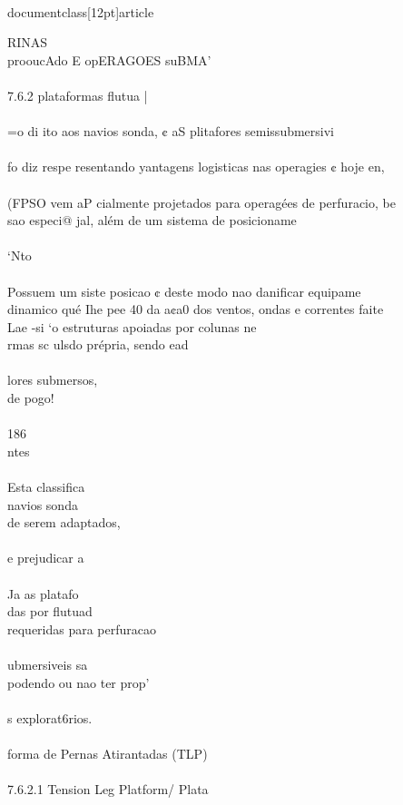 \\documentclass[12pt]{article}
\begin{document}
RINAS\\
prooucAdo E opERAGOES suBMA'\\
\\
7.6.2 plataformas flutua |\\
\\
=o di ito aos navios sonda, ¢ aS plitafores semissubmersivi\\
\\
fo diz respe resentando yantagens logisticas nas operagies ¢ hoje en,\\
\\
(FPSO vem aP cialmente projetados para operagées de perfuracio, be\\
sao especi@ jal, além de um sistema de posicioname\\
\\
‘Nto\\
\\
Possuem um siste posicao ¢ deste modo nao danificar equipame\\
dinamico qué Ihe pee 40 da a¢a0 dos ventos, ondas e correntes faite\\
Lae -si ‘o estruturas apoiadas por colunas ne\\
rmas sc ulsdo prépria, sendo ead\\
\\
lores submersos,\\
de pogo!\\
\\
186\\
ntes\\
\\
Esta classifica\\
navios sonda\\
de serem adaptados,\\
\\
e prejudicar a\\
\\
Ja as platafo\\
das por flutuad\\
requeridas para perfuracao\\
\\
ubmersiveis sa\\
podendo ou nao ter prop’\\
\\
s explorat6rios.\\
\\
forma de Pernas Atirantadas (TLP)\\
\\
7.6.2.1 Tension Leg Platform/ Plata\\
\end{document}

